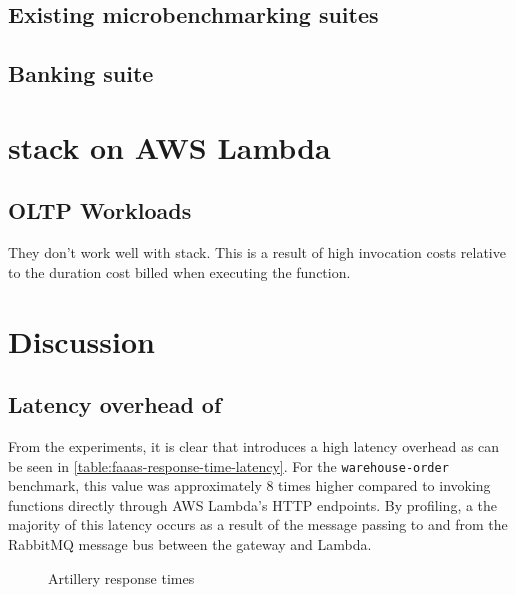 \subsection{Existing microbenchmarking suites}

\subsection{Banking suite}

\section{\faaas{} stack on AWS Lambda}

\subsection{OLTP Workloads}
They don't work well with \faaas{} stack. This is a result of high invocation costs relative to the duration cost billed when executing the function.


\section{Discussion}
\subsection{Latency overhead of \faaas{}}
From the experiments, it is clear that \faaas{} introduces a high latency overhead as can be seen in \ref{table:faaas-response-time-latency}. For the \verb|warehouse-order| benchmark, this value was approximately 8 times higher compared to invoking functions directly through AWS Lambda's HTTP endpoints. By profiling, a the majority of this latency occurs as a result of the message passing to and from the RabbitMQ message bus between the gateway and Lambda.

\begin{figure}
    \begin{center}
        
    \end{center}
    \caption{Artillery response times}
\end{figure}


